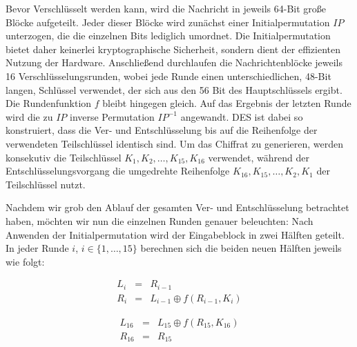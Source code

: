 Bevor Verschlüsselt werden kann, wird die Nachricht in jeweils 64-Bit große Blöcke aufgeteilt. Jeder dieser Blöcke wird zunächst einer Initialpermutation $IP$ unterzogen, die die einzelnen Bits lediglich umordnet. Die Initialpermutation bietet daher keinerlei kryptographische Sicherheit, sondern dient der effizienten Nutzung der Hardware. Anschließend durchlaufen die Nachrichtenblöcke jeweils 16 Verschlüsselungsrunden, wobei jede Runde  einen unterschiedlichen, 48-Bit langen, Schlüssel verwendet, der sich aus den 56 Bit des Hauptschlüssels ergibt. Die Rundenfunktion $f$ bleibt hingegen gleich. Auf das Ergebnis der letzten Runde wird die zu $IP$ inverse Permutation $IP^{-1}$ angewandt.
%
DES ist dabei so konstruiert, dass die Ver- und Entschlüsselung bis auf die Reihenfolge der verwendeten Teilschlüssel identisch sind. Um das Chiffrat zu generieren, werden konsekutiv die Teilschlüssel $K_1,K_2,\ldots,K_{15},K_{16}$ verwendet, während der Entschlüsselungsvorgang die umgedrehte Reihenfolge $K_{16},K_{15},\ldots,K_2,K_1$ der Teilschlüssel nutzt.

Nachdem wir grob den Ablauf der gesamten Ver- und Entschlüsselung betrachtet haben, möchten wir nun die einzelnen Runden genauer beleuchten: Nach Anwenden der Initialpermutation wird der Eingabeblock in zwei Hälften geteilt. In jeder Runde $i$, $i \in \{1,\ldots,15\}$ berechnen sich die beiden neuen Hälften jeweils wie folgt:

\noindent
\begin{minipage}[h]{.45\textwidth}
	\begin{eqnarray*}
		L_i	& =	& R_{i-1} \\
		R_i 	& =	& L_{i-1} \oplus f(R_{i-1}, K_i)
	\end{eqnarray*}
\end{minipage}\hfill
\begin{minipage}[h]{.45\textwidth}
	\begin{eqnarray*}
		L_{16} 	& =	& L_{15} \oplus f(R_{15}, K_{16}) \\
		R_{16}	& =	& R_{15}
	\end{eqnarray*}
\end{minipage}
\bigskip

